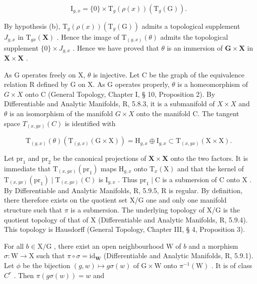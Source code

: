\[
\mathrm{I} _ {g, x} = \{0 \} \times \mathrm{T} _ {g} (\rho (x)) (\mathrm{T} _ {g} (\mathrm{G})).
\]

By hypothesis (b), \(\mathrm{T}_g(\rho(x))(\mathrm{T}_g(\mathrm{G}))\) admits a topological supplement \(J_{g,x}\) in \(\mathrm{T}_{gx}(\mathbf{X})\) . Hence the image of \(\mathrm{T}_{(g,x)}(\theta)\) admits the topological supplement \(\{0\} \times J_{g,x}\) . Hence we have proved that \(\theta\) is an immersion of \(\mathbf{G} \times \mathbf{X}\) in \(\mathbf{X} \times \mathbf{X}\) .

As G operates freely on X, \(\theta\) is injective. Let C be the graph of the equivalence relation R defined by G on X. As G operates properly, \(\theta\) is a homeomorphism of \(G \times X\) onto C (General Topology, Chapter I, § 10, Proposition 2). By Differentiable and Analytic Manifolds, R, 5.8.3, it is a submanifold of \(X \times X\) and \(\theta\) is an isomorphism of the manifold \(G \times X\) onto the manifold C. The tangent space \(T_{(x,gx)}(C)\) is identified with

\[
\mathrm{T} _ {(g, x)} (\theta) \left(\mathrm{T} _ {(g, x)} (\mathrm{G} \times \mathrm{X})\right) = \mathrm{H} _ {g, x} \oplus \mathrm{I} _ {g, x} \subset \mathrm{T} _ {(x, g x)} (\mathrm{X} \times \mathrm{X}).
\]

Let \(\mathrm{pr}_1\) and \(\mathrm{pr}_2\) be the canonical projections of \(\mathbf{X} \times \mathbf{X}\) onto the two factors. It is immediate that \(\mathrm{T}_{(x,gx)}(\mathrm{pr}_1)\) maps \(\mathrm{H}_{g,x}\) onto \(\mathrm{T}_x(\mathrm{X})\) and that the kernel of \(\mathrm{T}_{(x,gx)}(\mathrm{pr}_1) \mid \mathrm{T}_{(x,gx)}(\mathrm{C})\) is \(\mathrm{I}_{g,x}\) . Thus \(\mathrm{pr}_1 \mid \mathrm{C}\) is a submersion of \(\mathrm{C}\) onto \(\mathrm{X}\) . By Differentiable and Analytic Manifolds, R, 5.9.5, R is regular. By definition, there therefore exists on the quotient set X/G one and only one manifold structure such that \(\pi\) is a submersion. The underlying topology of X/G is the quotient topology of that of X (Differentiable and Analytic Manifolds, R, 5.9.4). This topology is Hausdorff (General Topology, Chapter III, § 4, Proposition 3).

For all \(b \in \mathrm{X} / \mathrm{G}\) , there exist an open neighbourhood \(\mathrm{W}\) of \(b\) and a morphism \(\sigma: \mathrm{W} \to \mathrm{X}\) such that \(\pi \circ \sigma = \mathrm{id}_{\mathbf{W}}\) (Differentiable and Analytic Manifolds, R, 5.9.1). Let \(\phi\) be the bijection \((g, w) \mapsto g\sigma(w)\) of \(\mathrm{G} \times \mathrm{W}\) onto \(\pi^{-1}(\mathrm{W})\) . It is of class \(C^r\) . Then \(\pi(g\sigma(w)) = w\) and

